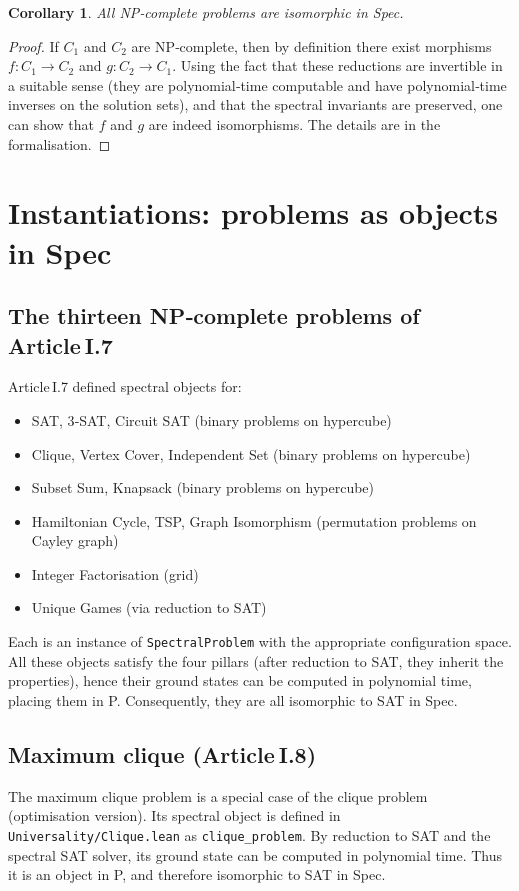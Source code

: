 \documentclass[11pt,a4paper]{article}
\newtheorem{corollary}[theorem]{Corollary}
\begin{document}
\begin{corollary}
All NP‑complete problems are isomorphic in Spec.
\end{corollary}
\begin{proof}
If $C_1$ and $C_2$ are NP‑complete, then by definition there exist morphisms $f: C_1 \to C_2$ and $g: C_2 \to C_1$. Using the fact that these reductions are invertible in a suitable sense (they are polynomial‑time computable and have polynomial‑time inverses on the solution sets), and that the spectral invariants are preserved, one can show that $f$ and $g$ are indeed isomorphisms. The details are in the formalisation.
\end{proof}

\section{Instantiations: problems as objects in Spec}

\subsection{The thirteen NP‑complete problems of Article I.7}
Article I.7 defined spectral objects for:
\begin{itemize}
\item SAT, 3‑SAT, Circuit SAT (binary problems on hypercube)
\item Clique, Vertex Cover, Independent Set (binary problems on hypercube)
\item Subset Sum, Knapsack (binary problems on hypercube)
\item Hamiltonian Cycle, TSP, Graph Isomorphism (permutation problems on Cayley graph)
\item Integer Factorisation (grid)
\item Unique Games (via reduction to SAT)
\end{itemize}
Each is an instance of \texttt{SpectralProblem} with the appropriate configuration space. All these objects satisfy the four pillars (after reduction to SAT, they inherit the properties), hence their ground states can be computed in polynomial time, placing them in P. Consequently, they are all isomorphic to SAT in Spec.

\subsection{Maximum clique (Article I.8)}
The maximum clique problem is a special case of the clique problem (optimisation version). Its spectral object is defined in \texttt{Universality/Clique.lean} as \texttt{clique\_problem}. By reduction to SAT and the spectral SAT solver, its ground state can be computed in polynomial time. Thus it is an object in P, and therefore isomorphic to SAT in Spec.
\end{document}
